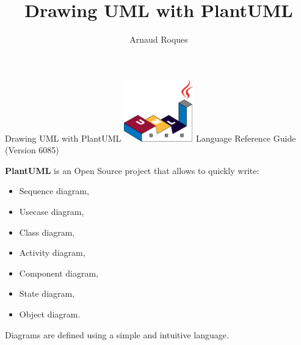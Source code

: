 \documentclass{article}
\author{Arnaud Roques}
\title{Drawing UML with PlantUML}
\begin{document}
\begin{titlepage}
	\begin{center}
		\Huge{Drawing UML with PlantUML}
		\vskip 5mm
		\includegraphics[width=30mm]{img/Logo_PlantUML.eps}
		\vskip 5mm
		\Large{Language Reference Guide}
		\vskip 1mm
		\large{(Version 6085)}
	\end{center}

	\vskip 2cm
	\textbf{PlantUML} is an Open Source project that allows to quickly write:
	\begin{itemize}
	\item Sequence diagram,
	\item Usecase diagram,
	\item Class diagram,
	\item Activity diagram,
	\item Component diagram,
	\item State diagram,
	\item Object diagram.
	\end{itemize}
	Diagrams are defined using a simple and intuitive language.
	

\end{titlepage}















\tableofcontents
\end{document}
